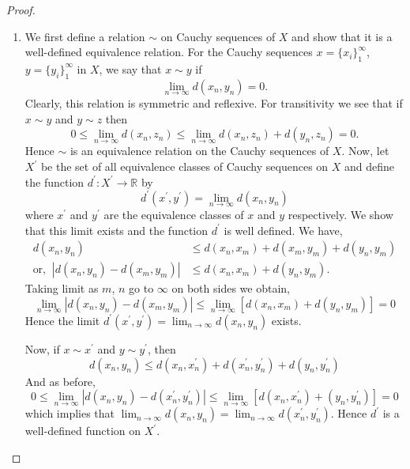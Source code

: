\documentclass[12pt]{article}
\newcommand{\rl}{\mathbb{R}}
\newcommand{\xprime}{X^\prime}
\begin{document}
\begin{enumerate}
\begin{mybox}
\begin{proof}
        \vspace*{2mm}
        \begin{enumerate}
            \item We first define a relation $\sim$ on Cauchy
            sequences of $X$ and show that it is a
            well-defined equivalence relation. For 
            the Cauchy sequences
            $x= \{x_i\}_1^\infty$,
            $y= \{y_i\}_1^\infty$ in $X$, we
            say that $x \sim y$ if
            $$\lim_{n\to\infty}{d(x_n,y_n)}=0.$$
            Clearly, this relation is symmetric and
            reflexive. For transitivity we see that
            if $x\sim y$ and $y\sim z$ then
            $$0\leq\lim_{n\to\infty}{d(x_n,z_n)}\leq
            \lim_{n\to\infty}{d(x_n,z_n) +d(y_n,z_n)}
            =0.$$
            Hence $\sim$ is an equivalence relation on the
            Cauchy sequences of $X$. Now, let $\xprime$ be the
            set of all equivalence classes of Cauchy
            sequences on $X$ and define the function
            $d^\prime:\xprime\to \rl$ by 
            $$d^\prime(x^\prime,y^\prime)=
            \lim_{n\to\infty}{d(x_n,y_n)}$$
            where $x^\prime$ and $y^\prime$ are the equivalence
            classes of $x$ and $y$ respectively. We show that this
            limit exists and the function $d^\prime$ is well
            defined. We have,
            \begin{align*}
                d(x_n,y_n)&\leq d(x_n,x_m)+d(x_m,y_m)
                +d(y_n,y_m)\\
                \text{or, }\ |d(x_n,y_n)-d(x_m,y_m)|
                &\leq d(x_n,x_m)+d(y_n,y_m).
            \end{align*}
            Taking limit as $m$, $n$ go to $\infty$
            on both sides we obtain,
            $$\lim_{n\to\infty}{|d(x_n,y_n)-d(x_m,y_m)|}
            \leq \lim_{n\to\infty}{\left[d(x_n,x_m)+
            d(y_n,y_m)\right]}=0$$
            Hence the limit $d^\prime(x^\prime,y^\prime)=
            \lim_{n\to\infty}{d(x_n,y_n)}$ exists.
    
            \vspace*{3mm}
            Now, if $x\sim x^\prime$ and $y\sim y^\prime$, then
            $$d(x_n,y_n)\leq d(x_n,x^\prime_n)+
            d(x_n^\prime,y_n^\prime)
            +d(y_n,y_n^\prime)$$
            And as before,
            $$0\leq \lim_{n\to\infty}{|d(x_n,y_n)-
            d(x_n^\prime,y_n^\prime)|}
            \leq \lim_{n\to\infty}{\left[d(x_n,x^\prime_n)+
            (y_n,y_n^\prime)\right]}=0$$
            which implies that $\lim_{n\to\infty}{d(x_n,y_n)}
            =\lim_{n\to\infty}{d(x_n^\prime,y_n^\prime)}$.
            Hence $d^\prime$ is a well-defined function on
            $\xprime$.
    

\end{enumerate}
\end{proof}
\end{mybox}
\end{enumerate}
\end{document}
